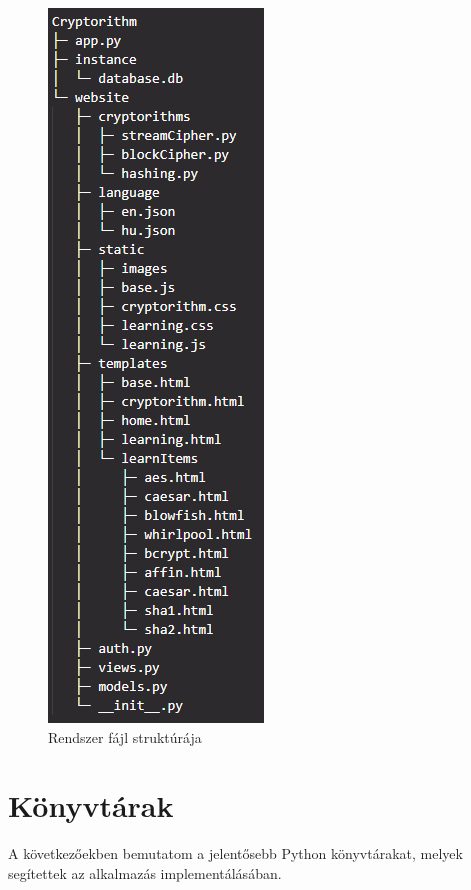 \begin{figure}[!h]
	\centering
	\includegraphics[scale=0.9]{images/fájlStruktúra}
	\caption{Rendszer fájl struktúrája}
\end{figure}

\section {Könyvtárak}
A következőekben bemutatom a jelentősebb Python könyvtárakat, melyek segítettek az alkalmazás implementálásában.

